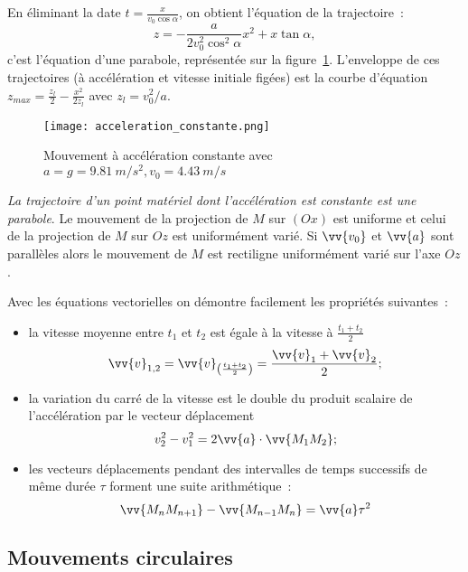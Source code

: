 En éliminant la date \(t=\frac{x}{v_0\cos\alpha}\), on obtient l'équation de 
la trajectoire~:
\begin{equation}%
  z = -\frac{a}{2v_0^2\cos^2\alpha}x^2+x\tan\alpha,
\end{equation}%
c'est l'équation d'une parabole, représentée sur la 
figure~\ref{fig:acceleration_constante}. L'enveloppe de ces trajectoires (à 
accélération et vitesse initiale figées) est la courbe d'équation \(z_{max} = 
\frac{z_l}{2} - \frac{x^2}{2 z_l}\) avec \(z_l = v_0^2/a\).%

\begin{figure}%
  \centering
  \texttt{[image: acceleration\_constante.png]}%
  \caption{Mouvement à accélération constante avec \(a = g = \SI{9,81}{m/s^2}, 
  v_0=\SI{4.43}{m/s}\)}
  \label{fig:acceleration_constante}%
\end{figure}%
\emph{La trajectoire d'un point matériel dont l'accélération est constante est 
une parabole}. Le mouvement de la projection de \(M\) sur \((Ox)\) est 
uniforme et celui de la projection de \(M\) sur \(Oz\) est uniformément varié. 
Si \(\vv{v_0}\) et \(\vv{a}\) sont parallèles alors le mouvement de \(M\) est 
rectiligne uniformément varié sur l'axe \(Oz\).

Avec les équations vectorielles on démontre facilement les propriétés 
suivantes~:
\begin{itemize}%
\item la vitesse moyenne entre \(t_1\) et \(t_2\) est égale à la vitesse à 
  \(\frac{t_1+t_2}{2}\)
  \begin{equation}%
    \vv{v}_{1,2}=\vv{v}_{\left(\frac{t_1+t_2}{2}\right)}=\frac{\vv{v}_1+\vv{v}_2}{2};%
  \end{equation}%
\item la variation du carré de la vitesse est le double du produit scalaire de 
  l'accélération par le vecteur déplacement
  \begin{equation}%
v_2^2-v_1^2=2\vv{a}\cdot \vv{M_1M_2};
  \end{equation}%
\item les vecteurs déplacements pendant des intervalles de temps successifs de 
  même durée \(\tau\) forment une suite arithmétique~:
  \begin{equation}%
    \vv{M_nM_{n+1}}-\vv{M_{n-1}M_{n}}=\vv{a}\tau^2%
  \end{equation}%
\end{itemize}%

\subsection{Mouvements circulaires}%
\label{chap1-subsec:mvtcirc}%


